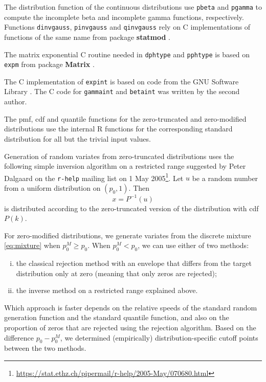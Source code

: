 \documentclass[x11names]{article}
\newcommand{\proglang}[1]{\textsf{#1}}
\newcommand{\pkg}[1]{\textbf{#1}}
\newcommand{\code}[1]{\texttt{#1}}
\begin{document}
The distribution function of the continuous distributions use
\code{pbeta} and \code{pgamma} to compute the incomplete beta and
incomplete gamma functions, respectively. Functions \code{dinvgauss},
\code{pinvgauss} and \code{qinvgauss} rely on C implementations of
functions of the same name from package \pkg{statmod} \citep{statmod}.

The matrix exponential \proglang{C} routine needed in \code{dphtype}
and \code{pphtype} is based on \code{expm} from package
\pkg{Matrix} \citep{Matrix}.

The C implementation of \code{expint} is based on code from the GNU
Software Library \citep{GSL}. The \proglang{C} code for
\code{gammaint} and \code{betaint} was written by the second author.

The pmf, cdf and quantile functions for the zero-truncated and
zero-modified distributions use the internal \proglang{R} functions
for the corresponding standard distribution for all but the trivial
input values.

Generation of random variates from zero-truncated distributions uses
the following simple inversion algorithm on a restricted range
suggested by Peter Dalgaard on the \code{r-help} mailing list on 1 May
2005\footnote{%
  \url{https://stat.ethz.ch/pipermail/r-help/2005-May/070680.html}}.
Let $u$ be a random number from a uniform distribution on $(p_0, 1)$.
Then
\begin{equation*}
  x = P^{-1}(u)
\end{equation*}
is distributed according to the zero-truncated version of the
distribution with cdf $P(k)$.

For zero-modified distributions, we generate variates from the
discrete mixture \eqref{eq:mixture} when $p_0^M \geq p_0$. When
$p_0^M < p_0$, we can use either of two methods:
\begin{enumerate}[i)]
\item the classical rejection method with an envelope that differs
  from the target distribution only at zero (meaning that only zeros
  are rejected);
\item the inverse method on a restricted range explained above.
\end{enumerate}
Which approach is faster depends on the relative speeds of the
standard random generation function and the standard quantile
function, and also on the proportion of zeros that are rejected using
the rejection algorithm. Based on the difference $p_0 - p_0^M$, we
determined (empirically) distribution-specific cutoff points between
the two methods.
\end{document}

